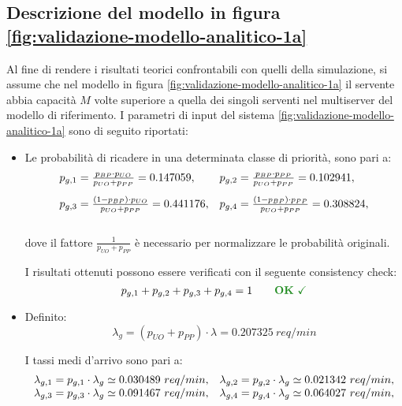 \subsection{Descrizione del modello in figura \ref{fig:validazione-modello-analitico-1a}}
Al fine di rendere i risultati teorici confrontabili con quelli della simulazione, si assume che nel modello in figura \ref{fig:validazione-modello-analitico-1a} il servente abbia capacità $M$ volte superiore a quella dei singoli serventi nel multiserver del modello di riferimento.
\newpage
I parametri di input del sistema \ref{fig:validazione-modello-analitico-1a} sono di seguito riportati:
\begin{itemize}
\item Le probabilità di ricadere in una determinata classe di priorità, sono pari a:
\begin{equation}
\begin{array}{l l}
p_{g,1} = \frac{p_{BP} \cdot p_{UO}}{p_{UO} + p_{PP}} = 0.147059, & p_{g,2} = \frac{p_{BP} \cdot p_{PP}}{p_{UO} + p_{PP}} = 0.102941, \\[1em]
p_{g,3} = \frac{(1-p_{BP}) \cdot p_{UO}}{p_{UO} + p_{PP}} = 0.441176, & p_{g,4} = \frac{(1-p_{BP}) \cdot p_{PP}}{p_{UO} + p_{PP}} = 0.308824, \\[1.5em]
\end{array}
\end{equation}
dove il fattore $\frac{1}{p_{UO} + p_{PP}}$ è necessario per normalizzare le probabilità originali.

I risultati ottenuti possono essere verificati con il seguente consistency check:
\begin{equation}
p_{g,1} + p_{g,2} + p_{g,3} + p_{g,4} = 1 \qquad \text{\color{forestgreen}\textbf{OK} \checkmark}
\end{equation}
\item Definito:
\begin{equation}
\lambda_g = (p_{UO} + p_{PP})\cdot \lambda = 0.207325\ req/min
\end{equation} 

I tassi medi d'arrivo sono pari a:
\begin{equation}
\begin{array}{l l}
\lambda_{g,1} = p_{g,1} \cdot \lambda_g \simeq 0.030489\ req/min, & \lambda_{g,2} = p_{g,2} \cdot \lambda_g \simeq 0.021342\ req/min, \\
\lambda_{g,3} = p_{g,3} \cdot \lambda_g \simeq 0.091467\ req/min, & \lambda_{g,4} = p_{g,4} \cdot \lambda_g \simeq 0.064027\ req/min, \\[1em]
\end{array}
\end{equation}


\end{itemize}

